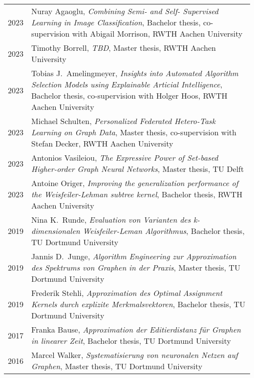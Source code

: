 \documentclass[11pt, a4paper, DIV=12]{scrartcl}
\begin{document}
\begin{longtabu}{p{2.1cm}p{12.0cm}}
	2023 & Nuray Agaoglu, \emph{Combining Semi- and Self- Supervised Learning in Image Classification}, Bachelor thesis, co-supervision with Abigail Morrison, RWTH Aachen University\\    
	2023 & Timothy Borrell, \emph{TBD}, Master thesis, RWTH Aachen University\\
	2023 & Tobias J.\ Amelingmeyer, \emph{Insights into Automated Algorithm Selection Models using Explainable Articial Intelligence}, Bachelor thesis, co-supervision with Holger Hoos, RWTH Aachen University \\
	2023 & Michael Schulten, \emph{Personalized Federated Hetero-Task Learning on Graph Data}, Master thesis, co-supervision with Stefan Decker, RWTH Aachen University                                         \\
	2023 & Antonios Vasileiou, \emph{The Expressive Power of Set-based Higher-order Graph Neural Networks}, Master thesis, TU Delft                                                                             \\
	2023 & Antoine Origer, \emph{Improving the generalization performance of the Weisfeiler-Lehman subtree kernel}, Bachelor thesis, RWTH Aachen University                                                     \\
	2019 & Nina K.\ Runde, \emph{Evaluation von Varianten des k-dimensionalen Weisfeiler-Leman Algorithmus}, Bachelor thesis, TU Dortmund University                                                            \\
	2019 & Jannis D.\ Junge, \emph{Algorithm Engineering zur Approximation des Spektrums von Graphen in der Praxis}, Master thesis, TU Dortmund University                                                      \\
	2019 & Frederik Stehli, \emph{Approximation des Optimal Assignment Kernels durch explizite Merkmalsvektoren}, Bachelor thesis, TU Dortmund University                                                       \\
	2017 & Franka Bause, \emph{Approximation der Editierdistanz für Graphen in linearer Zeit}, Bachelor thesis, TU Dortmund University                                                                          \\
	2016 & Marcel Walker, \emph{Systematisierung von neuronalen Netzen auf Graphen}, Master thesis, TU Dortmund University                                                                                      \\

\end{longtabu}
\end{document}
